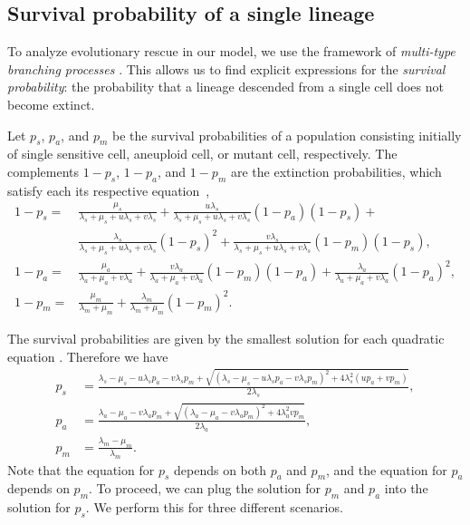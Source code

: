 \documentclass[12pt]{extarticle}
\begin{document}
\begin{appendices}
\renewcommand{\theequation}{\thesection\arabic{equation}}


\section{Survival probability of a single lineage}\label{sec:appendix-surv-prob}

To analyze evolutionary rescue in our model, we use the framework of \emph{multi-type branching processes} \citep{harris1963theory, weissman2009rate}. %
This allows us to find explicit expressions for the \emph{survival probability}: the probability that a lineage descended from a single cell does not become extinct.

Let $p_s$, $p_a$, and $p_m$ be the survival probabilities of a population consisting initially of single sensitive cell, aneuploid cell, or mutant cell, respectively.
The complements $1-p_s$, $1-p_a$, and $1-p_m$ are the extinction probabilities, which satisfy each its respective equation~\citep{harris1963theory},
\begin{equation} \label{eq:extinction_prob}
\begin{aligned}
1-p_s = &\frac{\mu_s}{\lambda_s+\mu_s+u\lambda_s+v\lambda_s} + 
		  \frac{u\lambda_s}{\lambda_s+\mu_s+u\lambda_s+v\lambda_s}\left(1-p_a\right)\left(1-p_s\right) + \\
		  & \frac{\lambda_s}{\lambda_s+\mu_s+u\lambda_s+v\lambda_s}\left(1-p_s\right)^2 +
		  \frac{v\lambda_s}{\lambda_s+\mu_s+u\lambda_s+v\lambda_s}\left(1-p_m\right)\left(1-p_s\right) ,\\
1-p_a = &\frac{\mu_a}{\lambda_a+\mu_a+v\lambda_a}+\frac{v\lambda_a}{\lambda_a+\mu_a+v\lambda_a}\left(1-p_m\right)\left(1-p_a\right)+\frac{\lambda_a}{\lambda_a+\mu_a+v\lambda_a}\left(1-p_a\right)^2 ,\\
1-p_m = &\frac{\mu_m}{\lambda_m+\mu_m}+\frac{\lambda_m}{\lambda_m+\mu_m}\left(1-p_m\right)^2 .	 
\end{aligned}
\end{equation}

The survival probabilities are given by the smallest solution for each quadratic equation \citep{uecker2015adaptive}. Therefore we have
\begin{equation}\label{eq:survival_prob}
\begin{aligned}
p_s &= \frac{\lambda_s-\mu_s-u\lambda_sp_a-v\lambda_sp_m+\sqrt{\left(\lambda_s-\mu_s-u\lambda_sp_a-v\lambda_sp_m\right)^2+4\lambda_s^2\left(up_a+vp_m\right)}}{2\lambda_s} ,\\
p_a &= \frac{\lambda_a-\mu_a-v\lambda_ap_m+\sqrt{\left(\lambda_a-\mu_a-v\lambda_ap_m\right)^2+4\lambda_a^2vp_m}}{2\lambda_a}, \\
p_m &= \frac{\lambda_m-\mu_m}{\lambda_m} .
\end{aligned} 
\end{equation}
Note that the equation for $p_s$ depends on both $p_a$ and $p_m$, and the equation for $p_a$ depends on $p_m$.
To proceed, we can plug the solution for $p_m$ and $p_a$ into the solution for $p_s$. We perform this for three different scenarios.


\end{appendices}
\end{document}
